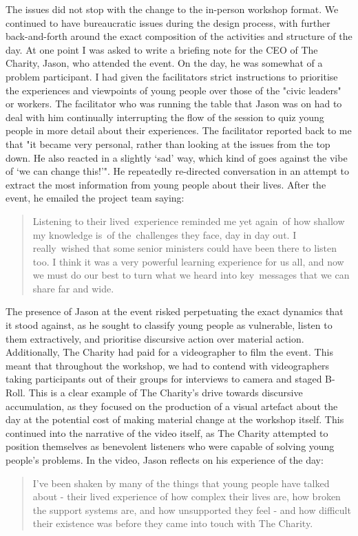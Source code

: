 The issues did not stop with the change to the in-person workshop format. We continued to have bureaucratic issues during the design process, with further back-and-forth around the exact composition of the activities and structure of the day. At one point I was asked to write a briefing note for the CEO of The Charity, Jason, who attended the event. On the day, he was somewhat of a problem participant. I had given the facilitators strict instructions to prioritise the experiences and viewpoints of young people over those of the "civic leaders" or workers. The facilitator who was running the table that Jason was on had to deal with him continually interrupting the flow of the session to quiz young people in more detail about their experiences. The facilitator reported back to me that "it became very personal, rather than looking at the issues from the top down. He also reacted in a slightly ‘sad’ way, which kind of goes against the vibe of ‘we can change this!’". He repeatedly re-directed conversation in an attempt to extract the most information from young people about their lives. After the event, he emailed the project team saying:
\blockquote{Listening to their lived experience reminded me yet again of how shallow my knowledge is of the challenges they face, day in day out. I really wished that some senior ministers could have been there to listen too.
I think it was a very powerful learning experience for us all, and now we must do our best to turn what we heard into key messages that we can share far and wide.}
The presence of Jason at the event risked perpetuating the exact dynamics that it stood against, as he sought to classify young people as vulnerable, listen to them extractively, and prioritise discursive action over material action. Additionally, The Charity had paid for a videographer to film the event. This meant that throughout the workshop, we had to contend with videographers taking participants out of their groups for interviews to camera and staged B-Roll. This is a clear example of The Charity's drive towards discursive accumulation, as they focused on the production of a visual artefact about the day at the potential cost of making material change at the workshop itself. This continued into the narrative of the video itself, as The Charity attempted to position themselves as benevolent listeners who were capable of solving young people's problems. In the video, Jason reflects on his experience of the day:

\blockquote{I've been shaken by many of the things that young people have talked about - their lived experience of how complex their lives are, how broken the support systems are, and how unsupported they feel - and how difficult their existence was before they came into touch with The Charity.}

